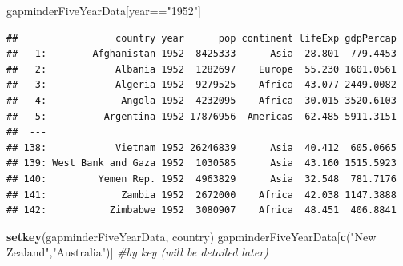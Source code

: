 \documentclass[]{article}
\newenvironment{Shaded}{\begin{snugshade}}{\end{snugshade}}
\newcommand{\KeywordTok}[1]{\textcolor[rgb]{0.13,0.29,0.53}{\textbf{{#1}}}}
\newcommand{\StringTok}[1]{\textcolor[rgb]{0.31,0.60,0.02}{{#1}}}
\newcommand{\CommentTok}[1]{\textcolor[rgb]{0.56,0.35,0.01}{\textit{{#1}}}}
\newcommand{\NormalTok}[1]{{#1}}
\begin{document}
\begin{Shaded}
\begin{Highlighting}[]
\NormalTok{gapminderFiveYearData[year==}\StringTok{"1952"}\NormalTok{]}
\end{Highlighting}
\end{Shaded}

\begin{verbatim}
##                 country year      pop continent lifeExp gdpPercap
##   1:        Afghanistan 1952  8425333      Asia  28.801  779.4453
##   2:            Albania 1952  1282697    Europe  55.230 1601.0561
##   3:            Algeria 1952  9279525    Africa  43.077 2449.0082
##   4:             Angola 1952  4232095    Africa  30.015 3520.6103
##   5:          Argentina 1952 17876956  Americas  62.485 5911.3151
##  ---                                                             
## 138:            Vietnam 1952 26246839      Asia  40.412  605.0665
## 139: West Bank and Gaza 1952  1030585      Asia  43.160 1515.5923
## 140:         Yemen Rep. 1952  4963829      Asia  32.548  781.7176
## 141:             Zambia 1952  2672000    Africa  42.038 1147.3888
## 142:           Zimbabwe 1952  3080907    Africa  48.451  406.8841
\end{verbatim}

\begin{Shaded}
\begin{Highlighting}[]
\KeywordTok{setkey}\NormalTok{(gapminderFiveYearData, country)}
\NormalTok{gapminderFiveYearData[}\KeywordTok{c}\NormalTok{(}\StringTok{"New Zealand"}\NormalTok{,}\StringTok{"Australia"}\NormalTok{)] }\CommentTok{#by key (will be detailed later)}
\end{Highlighting}
\end{Shaded}
\end{document}
